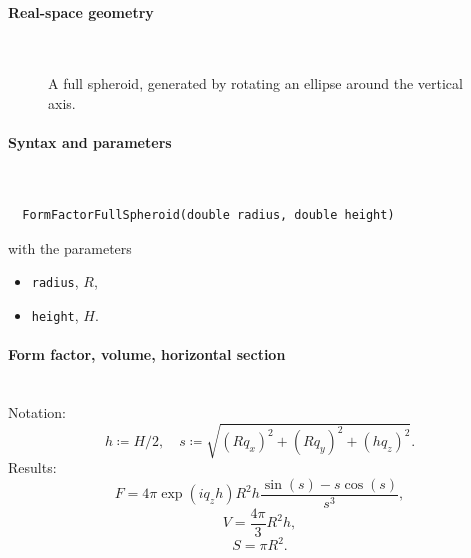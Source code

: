  \label{SFullSpheroid}

\paragraph{Real-space geometry}\strut\\

\begin{figure}[H]
\hfill
{}
\hfill
{}
\hfill
{}
\hfill
\caption{A full spheroid, generated by rotating an ellipse around the vertical axis.}
\end{figure}

\FloatBarrier

\paragraph{Syntax and parameters}\strut\\[-2ex plus .2ex minus .2ex]
\begin{lstlisting}
  FormFactorFullSpheroid(double radius, double height)
\end{lstlisting}
with the parameters
\begin{itemize}
\item \texttt{radius}, $R$,
\item \texttt{height}, $H$.
\end{itemize}

\paragraph{Form factor, volume, horizontal section}\strut\\
Notation:
\begin{equation*}
 h \coloneqq H/2, \quad
 s \coloneqq \sqrt{(R q_x)^2 + (R q_y)^2 + (h q_z)^2}.
\end{equation*}
Results:
\begin{equation*}
  F = 4\pi \exp(i q_z h) R^2 h\frac{\sin(s)-s\cos(s)}{s^3},
\end{equation*}
\begin{equation*}
  V =\dfrac{4\pi}{3}R^2h,
\end{equation*}
\begin{equation*}
  S =\pi R^2.
\end{equation*}

